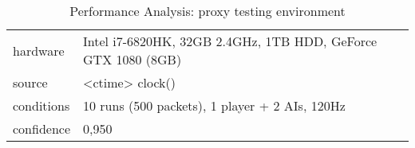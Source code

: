 \begin{table}[!ht]
	\centering
    \begin{tabular}{l|l}
        hardware & Intel i7-6820HK, 32GB 2.4GHz, 1TB HDD, GeForce GTX 1080 (8GB) \\
		source & <ctime> clock() \\
		conditions & 10 runs (500 packets), 1 player + 2 AIs, 120Hz \\
		confidence & 0,950 \\
    \end{tabular}

    \caption{Performance Analysis: proxy testing environment}\label{tb:performance:proxy}
\end{table}
